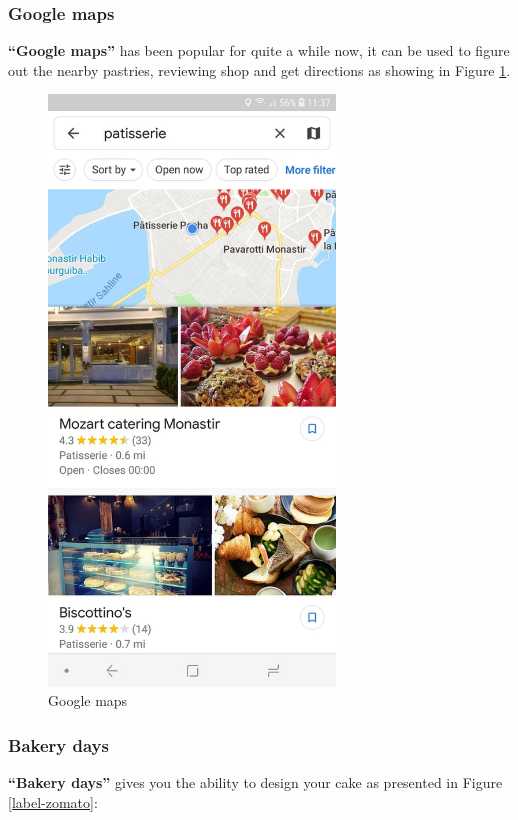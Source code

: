 \documentclass[12pt,a4paper]{report}
\begin{document}
	\subsubsection*{Google maps}
	\textbf{``Google maps''} has been popular for quite a while now, it can be used to figure out the nearby pastries, reviewing shop and get directions as showing in Figure \ref{label-googlemaps}. \par
	\begin{figure}[H]
		\centering
		\includegraphics[width=3in,keepaspectratio]{googlemaps.jpg}
		\caption{Google maps\protect{}\protect\footnotemark[\thefootnote]}
		
		
		
		\label{label-googlemaps}
	\end{figure}
	\clearpage
	\subsubsection*{Bakery days}
	\textbf{``Bakery days''} gives you the ability to design your cake as presented in Figure  \ref{label-zomato}:
	
\end{document}
